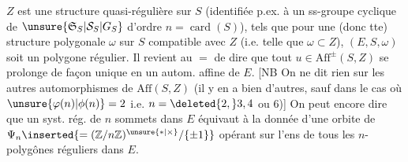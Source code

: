 $Z$ est une structure quasi-régulière sur $S$ (identifiée p.ex. à un ss-groupe cyclique de $\unsure{\mathfrak S_S|\mathcal S_S|G_S}$ d'ordre $n=\operatorname{card}(S)$), tels que pour une (donc tte) structure polygonale $\omega$ sur $S$ compatible avec $Z$ (i.e. telle que $\omega\subset Z$), $(E,S,\omega)$ soit un polygone régulier. Il revient au $=$ de dire que tout $u\in\mathrm{Aff}^{\pm}(S,Z)$ se prolonge de façon unique en un autom. affine de $E$. [NB On ne dit rien sur les autres automorphismes de $\mathrm{Aff}(S,Z)$ 
(il y en a bien d'autres, sauf dans le cas où $\unsure{\varphi(n)|\phi(n)}=2$  i.e. $n=\deleted{2,}3,4$ ou $6$)] On peut encore dire que un  syst. rég. de $n$ sommets dans $E$ équivaut à la donnée d'une orbite de $\Psi_n\inserted{=(\mathbb Z/n\mathbb Z)^{\unsure{*|\times}}/\{\pm1\}}$ opérant sur l'ens de tous les $n$-polygônes réguliers dans $E$.
